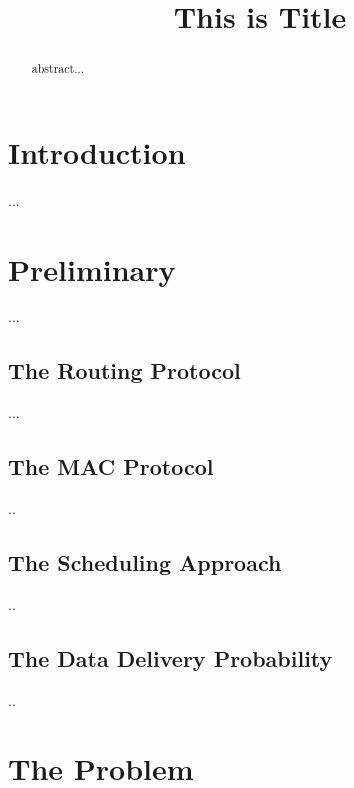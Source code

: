\documentclass[conference]{IEEEtran}
\theoremstyle{definition}
\begin{document}
\title{This is Title}

\author{
}

\maketitle

\begin{abstract}
abstract...	
\end{abstract}


\section{Introduction}
...

\section{Preliminary}
...

\subsection{The Routing Protocol}\label{subsec:RPL}
...

\subsection{The MAC Protocol}\label{subsec:TSCH}
..

\subsection{The Scheduling Approach}\label{subsec:DeTAS}
..

\subsection{The Data Delivery Probability}\label{subsec:data delivery probability}
..

\section{The Problem}
\end{document}
